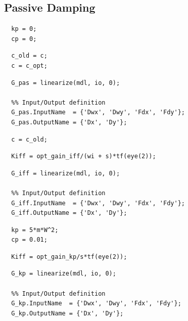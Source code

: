 \documentclass[a4paper, 10pt, DIV=12, parskip=full]{scrreprt}
\begin{document}
\subsection{Passive Damping}
\label{sec:orgc0de759}
\begin{verbatim}
  kp = 0;
  cp = 0;
\end{verbatim}

\begin{verbatim}
  c_old = c;
  c = c_opt;
\end{verbatim}

\begin{verbatim}
  G_pas = linearize(mdl, io, 0);

  %% Input/Output definition
  G_pas.InputName  = {'Dwx', 'Dwy', 'Fdx', 'Fdy'};
  G_pas.OutputName = {'Dx', 'Dy'};
\end{verbatim}

\begin{verbatim}
  c = c_old;
\end{verbatim}

\begin{verbatim}
  Kiff = opt_gain_iff/(wi + s)*tf(eye(2));
\end{verbatim}

\begin{verbatim}
  G_iff = linearize(mdl, io, 0);

  %% Input/Output definition
  G_iff.InputName  = {'Dwx', 'Dwy', 'Fdx', 'Fdy'};
  G_iff.OutputName = {'Dx', 'Dy'};
\end{verbatim}

\begin{verbatim}
  kp = 5*m*W^2;
  cp = 0.01;
\end{verbatim}

\begin{verbatim}
  Kiff = opt_gain_kp/s*tf(eye(2));
\end{verbatim}

\begin{verbatim}
  G_kp = linearize(mdl, io, 0);

  %% Input/Output definition
  G_kp.InputName  = {'Dwx', 'Dwy', 'Fdx', 'Fdy'};
  G_kp.OutputName = {'Dx', 'Dy'};
\end{verbatim}
\end{document}
